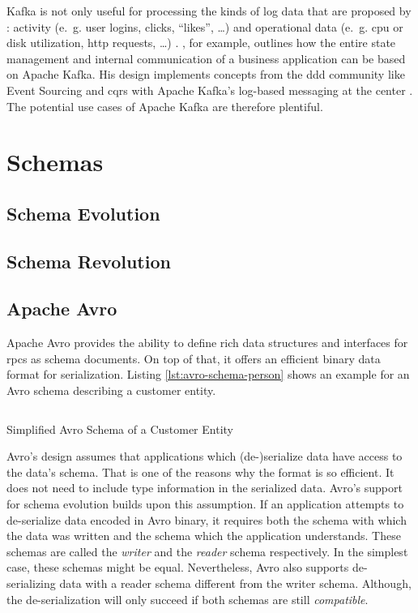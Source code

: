Kafka is not only useful for processing the kinds of log data that are proposed by \citeauthor{kreps_kafka_2011}: activity (e.~g. user logins, clicks, \enquote{likes}, \ldots) and operational data (e.~g. \gls{cpu} or disk utilization, \gls{http} requests, \ldots) \parencite{kreps_kafka_2011}.
\citeauthor{stopford_designing_2018}, for example, outlines how the entire state management and internal communication of a business application can be based on Apache Kafka.
His design implements concepts from the \gls{ddd} community like Event Sourcing \parencite{fowler_event_sourcing_2005} and \gls{cqrs} \parencite{fowler_cqrs_2011} with Apache Kafka's log-based messaging at the center \parencite{stopford_designing_2018}.
The potential use cases of Apache Kafka are therefore plentiful.

\section{Schemas}

\subsection{Schema Evolution}

\subsection{Schema Revolution}

\subsection{Apache Avro}

Apache Avro provides the ability to define rich data structures and interfaces for \glspl{rpc} as schema documents.
On top of that, it offers an efficient binary data format for serialization.
Listing \ref{lst:avro-schema-person} shows an example for an Avro schema describing a customer entity.
\parencite{apache_software_foundation_apache_2021}

\begin{listing}[H]
  \inputminted{json}{assets/src/Customer.avsc}
  \caption{Simplified Avro Schema of a Customer Entity}\label{lst:avro-schema-person}
\end{listing}

Avro's design assumes that applications which (de-)serialize data have access to the data's schema.
That is one of the reasons why the format is so efficient.
It does not need to include type information in the serialized data.
Avro's support for schema evolution builds upon this assumption.
If an application attempts to de-serialize data encoded in Avro binary, it requires both the schema with which the data was written and the schema which the application understands.
These schemas are called the \emph{writer} and the \emph{reader} schema respectively.
In the simplest case, these schemas might be equal.
Nevertheless, Avro also supports de-serializing data with a reader schema different from the writer schema.
Although, the de-serialization will only succeed if both schemas are still \emph{compatible}.
\parencite{apache_software_foundation_apache_2021}

